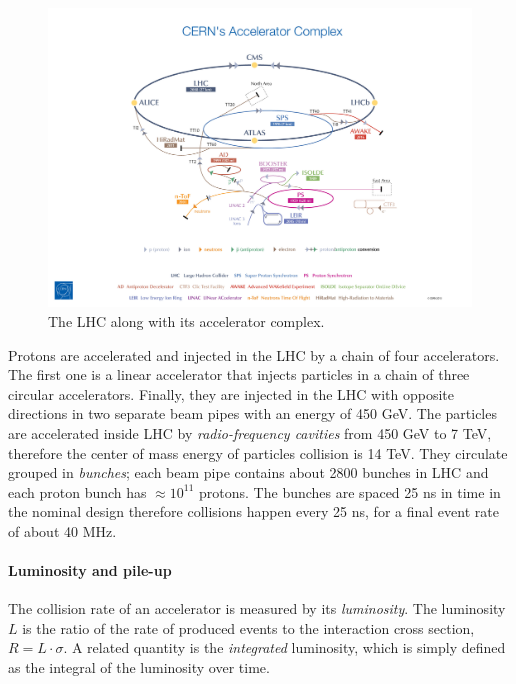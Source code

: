 \begin{figure}
    \centering
    \includegraphics[width=\columnwidth]{gfx/ch1/CERN's-accelerator-complex2013.jpg}
    \caption[The LHC]{The LHC along with its accelerator complex.}
    \label{fig:cernacc}
\end{figure}

Protons are accelerated and injected in the LHC by a chain of four accelerators.
The first one is a linear accelerator that injects particles in a chain of three circular
accelerators. Finally, they are injected in the LHC with opposite directions in
two separate beam pipes with an energy of 450 GeV. The particles are accelerated
inside LHC by \emph{radio-frequency cavities} from 450 GeV to 7 TeV, therefore
the center of mass energy of particles collision is 14 TeV. They circulate
grouped in \emph{bunches}; each beam pipe contains about 2800 bunches in LHC and each
proton bunch has $\approx 10^{11}$ protons. The bunches are spaced 25 ns in time in the nominal
design therefore collisions happen every 25 ns, for a final event rate of about 40 MHz.

\paragraph{Luminosity and pile-up}

The collision rate of an accelerator is measured by its \emph{luminosity}. The luminosity $L$
is the ratio of the rate of produced events to the interaction cross section, $R = L \cdot \sigma$.
A related quantity is the \emph{integrated} luminosity, which is simply defined as the integral of the luminosity over time.

